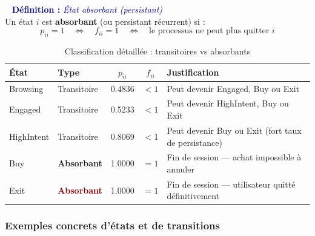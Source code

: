 \documentclass[11pt,a4paper]{article}
\newenvironment{defbox}[1]{%
  \vspace{3pt}\begin{framed}
  \noindent{\color{NavyBlue}\rule{0.3cm}{3pt}}~%
  \textcolor{DarkBlue}{\textbf{Définition :} \textit{#1}}\\[3pt]}
  {\end{framed}\vspace{3pt}}
\newcommand{\st}[1]{\textsf{\small#1}}
\begin{document}
\begin{defbox}{État absorbant (persistant)}
Un état $i$ est \textbf{absorbant} (ou persistant récurrent) si :
\[
  p_{ii} = 1 \quad \Leftrightarrow \quad
  f_{ii} = 1 \quad \Leftrightarrow \quad
  \text{le processus ne peut plus quitter } i
\]
\end{defbox}

\vspace{2pt}
\begin{table}[H]
\centering
\caption{Classification détaillée : transitoires vs absorbants}
\label{tab:type_etats}
\begin{tabular}{llccl}
\toprule
\rowcolor{DarkBlue}
\color{white}\textbf{État} &
\color{white}\textbf{Type} &
\color{white}$p_{ii}$ &
\color{white}$f_{ii}$ &
\color{white}\textbf{Justification} \\
\midrule
\rowcolor{LightBlue}
\st{Browsing}   & Transitoire & 0.4836 & $<1$ &
  Peut devenir Engaged, Buy ou Exit \\
\rowcolor{LightGreen}
\st{Engaged}    & Transitoire & 0.5233 & $<1$ &
  Peut devenir HighIntent, Buy ou Exit \\
\rowcolor{LightOrange}
\st{HighIntent} & Transitoire & 0.8069 & $<1$ &
  Peut devenir Buy ou Exit (fort taux de persistance) \\
\rowcolor{LightBuy}
\st{Buy}  & \textcolor{BuyGreen}{\bfseries Absorbant} & 1.0000 & $=1$ &
  Fin de session --- achat impossible à annuler \\
\rowcolor{LightRed}
\st{Exit} & \textcolor{DarkRed}{\bfseries Absorbant}  & 1.0000 & $=1$ &
  Fin de session --- utilisateur quitté définitivement \\
\bottomrule
\end{tabular}
\end{table}

\subsubsection{Exemples concrets d'états et de transitions}
\end{document}
